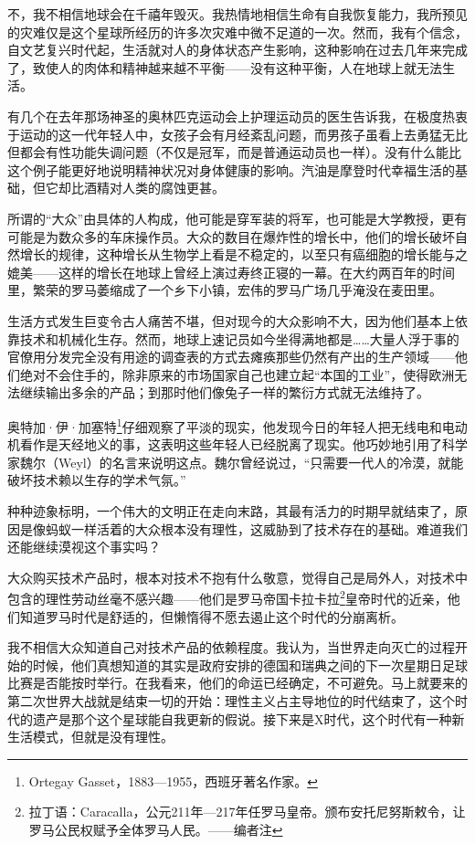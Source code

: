 \documentclass[UTF8]{ctexart}
\begin{document}
不，我不相信地球会在千禧年毁灭。我热情地相信生命有自我恢复能力，我所预见的灾难仅是这个星球所经历的许多次灾难中微不足道的一次。然而，我有个信念，自文艺复兴时代起，生活就对人的身体状态产生影响，这种影响在过去几年来完成了，致使人的肉体和精神越来越不平衡——没有这种平衡，人在地球上就无法生活。

有几个在去年那场神圣的奥林匹克运动会上护理运动员的医生告诉我，在极度热衷于运动的这一代年轻人中，女孩子会有月经紊乱问题，而男孩子虽看上去勇猛无比但都会有性功能失调问题（不仅是冠军，而是普通运动员也一样）。没有什么能比这个例子能更好地说明精神状况对身体健康的影响。汽油是摩登时代幸福生活的基础，但它却比酒精对人类的腐蚀更甚。

所谓的“大众”由具体的人构成，他可能是穿军装的将军，也可能是大学教授，更有可能是为数众多的车床操作员。大众的数目在爆炸性的增长中，他们的增长破坏自然增长的规律，这种增长从生物学上看是不稳定的，以至只有癌细胞的增长能与之媲美——这样的增长在地球上曾经上演过寿终正寝的一幕。在大约两百年的时间里，繁荣的罗马萎缩成了一个乡下小镇，宏伟的罗马广场几乎淹没在麦田里。

生活方式发生巨变令古人痛苦不堪，但对现今的大众影响不大，因为他们基本上依靠技术和机械化生存。然而，地球上速记员如今坐得满地都是……大量人浮于事的官僚用分发完全没有用途的调查表的方式去瘫痪那些仍然有产出的生产领域——他们绝对不会住手的，除非原来的市场国家自己也建立起“本国的工业”，使得欧洲无法继续输出多余的产品；到那时他们像兔子一样的繁衍方式就无法维持了。

奥特加·伊·加塞特\footnote{Ortegay Gasset，1883—1955，西班牙著名作家。}仔细观察了平淡的现实，他发现今日的年轻人把无线电和电动机看作是天经地义的事，这表明这些年轻人已经脱离了现实。他巧妙地引用了科学家魏尔（Weyl）的名言来说明这点。魏尔曾经说过，“只需要一代人的冷漠，就能破坏技术赖以生存的学术气氛。”

种种迹象标明，一个伟大的文明正在走向末路，其最有活力的时期早就结束了，原因是像蚂蚁一样活着的大众根本没有理性，这威胁到了技术存在的基础。难道我们还能继续漠视这个事实吗？

大众购买技术产品时，根本对技术不抱有什么敬意，觉得自己是局外人，对技术中包含的理性劳动丝毫不感兴趣——他们是罗马帝国卡拉卡拉\footnote{拉丁语：Caracalla，公元211年—217年任罗马皇帝。颁布安托尼努斯敕令，让罗马公民权赋予全体罗马人民。——编者注}皇帝时代的近亲，他们知道罗马时代是舒适的，但懒惰得不愿去遏止这个时代的分崩离析。

我不相信大众知道自己对技术产品的依赖程度。我认为，当世界走向灭亡的过程开始的时候，他们真想知道的其实是政府安排的德国和瑞典之间的下一次星期日足球比赛是否能按时举行。在我看来，他们的命运已经确定，不可避免。马上就要来的第二次世界大战就是结束一切的开始：理性主义占主导地位的时代结束了，这个时代的遗产是那个这个星球能自我更新的假说。接下来是X时代，这个时代有一种新生活模式，但就是没有理性。
\end{document}
